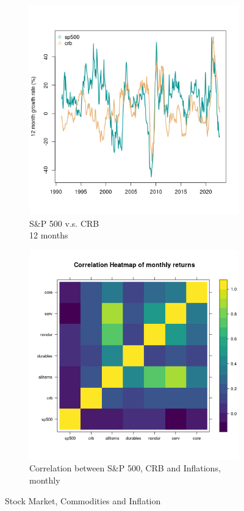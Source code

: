 \documentclass{article}
\begin{document}
\begin{figure}[h!]
\begin{subfigure}{0.33\textwidth}
  \includegraphics[width=\linewidth]{../../figures/cumgrowth12.png}
  \caption{S\&P 500 v.s. CRB
  \\
   12 months}
  \label{fig:sfig2}
\end{subfigure}
\begin{subfigure}{0.33\textwidth}
  \centering
  \includegraphics[width=\linewidth]{../../figures/heatmappce.png}
  \caption{Correlation between S\&P 500, CRB and Inflations, monthly}
  \label{fig:sfig3}
\end{subfigure}
\caption{Stock Market, Commodities and Inflation}
\label{fig:SP}
\end{figure}
\end{document}
